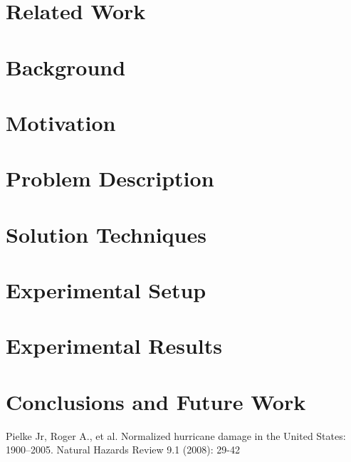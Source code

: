 \documentclass[12pt,conference]{IEEEtran}
\begin{document}
\section{Related Work}

\section{Background}

\section{Motivation}

\section{Problem Description}

\section{Solution Techniques}

\section{Experimental Setup}

\section{Experimental Results}

\section{Conclusions and Future Work}

\begin{thebibliography}{1}
 Pielke Jr, Roger A., et al. Normalized hurricane damage in the United States: 1900–2005. Natural Hazards Review 9.1 (2008): 29-42
\end{thebibliography}
\end{document}
